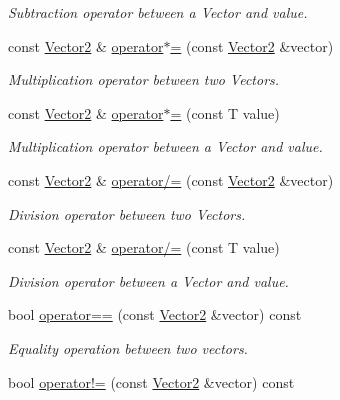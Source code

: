 \begin{DoxyCompactItemize}
\begin{DoxyCompactList}\small\item\em Subtraction operator between a Vector and value. \end{DoxyCompactList}\item 
const \hyperlink{classsparky_1_1_vector2}{Vector2} \& \hyperlink{classsparky_1_1_vector2_aa4e10696086e1fcefb03a9debc26da97}{operator$\ast$=} (const \hyperlink{classsparky_1_1_vector2}{Vector2} \&vector)
\begin{DoxyCompactList}\small\item\em Multiplication operator between two Vectors. \end{DoxyCompactList}\item 
const \hyperlink{classsparky_1_1_vector2}{Vector2} \& \hyperlink{classsparky_1_1_vector2_aefa9b779fc3f10462c4a9309934bb9d6}{operator$\ast$=} (const T value)
\begin{DoxyCompactList}\small\item\em Multiplication operator between a Vector and value. \end{DoxyCompactList}\item 
const \hyperlink{classsparky_1_1_vector2}{Vector2} \& \hyperlink{classsparky_1_1_vector2_a3529175fc7ec7ea46bb10e300f76f293}{operator/=} (const \hyperlink{classsparky_1_1_vector2}{Vector2} \&vector)
\begin{DoxyCompactList}\small\item\em Division operator between two Vectors. \end{DoxyCompactList}\item 
const \hyperlink{classsparky_1_1_vector2}{Vector2} \& \hyperlink{classsparky_1_1_vector2_a767b599519b6d4d5b23c94c65dc10806}{operator/=} (const T value)
\begin{DoxyCompactList}\small\item\em Division operator between a Vector and value. \end{DoxyCompactList}\item 
bool \hyperlink{classsparky_1_1_vector2_a96e356362b5d586662f9c015e1a5a929}{operator==} (const \hyperlink{classsparky_1_1_vector2}{Vector2} \&vector) const 
\begin{DoxyCompactList}\small\item\em Equality operation between two vectors. \end{DoxyCompactList}\item 
bool \hyperlink{classsparky_1_1_vector2_af18e1a53fd7f7bfd69ef0d2ebeab314f}{operator!=} (const \hyperlink{classsparky_1_1_vector2}{Vector2} \&vector) const 

\end{DoxyCompactItemize}
